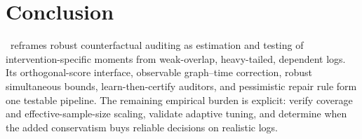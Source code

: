 \section{Conclusion}
\label{sec:conclusion}

\COMET\ reframes robust counterfactual auditing as estimation and testing of intervention-specific moments from weak-overlap, heavy-tailed, dependent logs. Its orthogonal-score interface, observable graph--time correction, robust simultaneous bounds, learn-then-certify auditors, and pessimistic repair rule form one testable pipeline. The remaining empirical burden is explicit: verify coverage and effective-sample-size scaling, validate adaptive tuning, and determine when the added conservatism buys reliable decisions on realistic logs.
